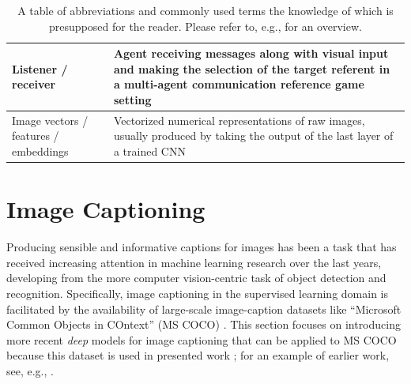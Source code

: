 \begin{table}[]
\begin{tabularx}{\textwidth}{|X|X|}
		Listener / receiver          & Agent receiving messages along with visual input and making the selection of the target referent \newline in a multi-agent communication reference game setting \\ \hline
		Image vectors / features / embeddings & Vectorized numerical representations of raw images, usually produced by taking the output of the last layer of a trained CNN \\ \hline
	\end{tabularx}
\caption{\label{tab:defs}A table of abbreviations and commonly used terms the knowledge of which is presupposed for the reader. Please refer to, e.g., \cite{goodfellow2016deep} for an overview.}

\end{table}


\section{Image Captioning}
\label{image_captioning}
Producing sensible and informative captions for images has been a task that has received increasing attention in machine learning research over the last years, developing from the more computer vision-centric task of object detection and recognition. Specifically, image captioning in the supervised learning domain is facilitated by the availability of large-scale image-caption datasets like ``Microsoft Common Objects in COntext'' (MS COCO) \parencite{lin2014microsoft, chen2015microsoft}. %
This section focuses on introducing more recent \textit{deep} models for image captioning that can be applied to MS COCO because this dataset is used in presented work \parencite{lecun2015deep}; for an example of earlier work, see, e.g., \cite{kulkarni2013babytalk}.

